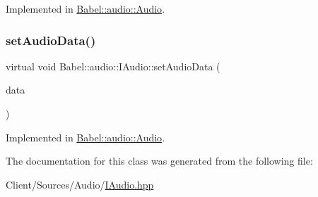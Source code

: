 Implemented in \hyperlink{classBabel_1_1audio_1_1Audio_ab14103faf465d65eab05f70a53d6ce67}{Babel\+::audio\+::\+Audio}.

\mbox{\label{classBabel_1_1audio_1_1IAudio_a6bac02d16b744cd8c81e5dd67636db0f}} 
\subsubsection{\texorpdfstring{set\+Audio\+Data()}{setAudioData()}}
{\footnotesize\ttfamily virtual void Babel\+::audio\+::\+I\+Audio\+::set\+Audio\+Data (\begin{DoxyParamCaption}\item[{\hyperlink{structaudioData}{audio\+Data} \&}]{data }\end{DoxyParamCaption})\hspace{0.3cm}{\ttfamily [pure virtual]}}



Implemented in \hyperlink{classBabel_1_1audio_1_1Audio_aed1e83c0c55e57cf785657f3988fccd1}{Babel\+::audio\+::\+Audio}.



The documentation for this class was generated from the following file\+:\begin{DoxyCompactItemize}
\item 
Client/\+Sources/\+Audio/\hyperlink{IAudio_8hpp}{I\+Audio.\+hpp}\end{DoxyCompactItemize}
